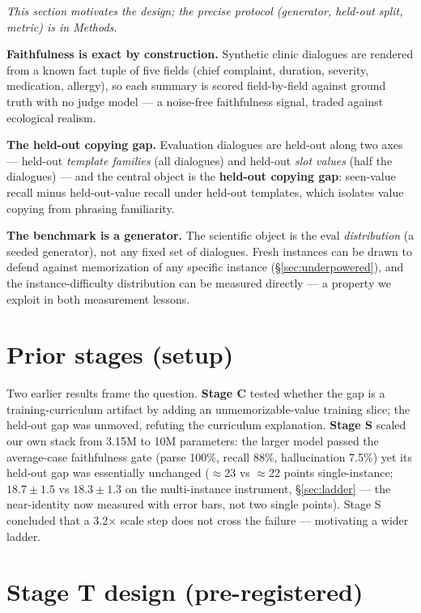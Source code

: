 \documentclass[11pt]{article}
\begin{document}
\emph{This section motivates the design; the precise protocol (generator, held-out split, metric) is in Methods.}

\textbf{Faithfulness is exact by construction.} Synthetic clinic dialogues are rendered from a known fact tuple of five fields (chief complaint, duration, severity, medication, allergy), so each summary is scored field-by-field against ground truth with no judge model --- a noise-free faithfulness signal, traded against ecological realism.

\textbf{The held-out copying gap.} Evaluation dialogues are held-out along two axes --- held-out \emph{template families} (all dialogues) and held-out \emph{slot values} (half the dialogues) --- and the central object is the \textbf{held-out copying gap}: seen-value recall minus held-out-value recall under held-out templates, which isolates value copying from phrasing familiarity.

\textbf{The benchmark is a generator.} The scientific object is the eval \emph{distribution} (a seeded generator), not any fixed set of dialogues. Fresh instances can be drawn to defend against memorization of any specific instance (\S\ref{sec:underpowered}), and the instance-difficulty distribution can be measured directly --- a property we exploit in both measurement lessons.

\section{Prior stages (setup)}\label{sec:prior}

Two earlier results frame the question. \textbf{Stage C} tested whether the gap is a training-curriculum artifact by adding an unmemorizable-value training slice; the held-out gap was unmoved, refuting the curriculum explanation. \textbf{Stage S} scaled our own stack from 3.15M to 10M parameters: the larger model passed the average-case faithfulness gate (parse 100\%, recall 88\%, hallucination 7.5\%) yet its held-out gap was essentially unchanged ($\approx$23 vs $\approx$22 points single-instance; $18.7\pm1.5$ vs $18.3\pm1.3$ on the multi-instance instrument, \S\ref{sec:ladder} --- the near-identity now measured with error bars, not two single points). Stage S concluded that a 3.2$\times$ scale step does not cross the failure --- motivating a wider ladder.

\section{Stage T design (pre-registered)}\label{sec:design}
\end{document}

